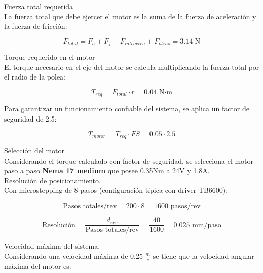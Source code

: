 Fuerza total requerida\\
\noindent
La fuerza total que debe ejercer el motor es la suma de la fuerza de aceleración y la fuerza de fricción:

\begin{equation}
    F_{total} = F_a + F_f + F_{intcorrea} + F_{otras} = 3.14 \text{ N}
\end{equation}

Torque requerido en el motor\\
\noindent
El torque necesario en el eje del motor se calcula multiplicando la fuerza total por el radio de la polea:

\begin{equation}
    T_{req} = F_{total} \cdot r = 0.04\text{ N·m}
\end{equation}

Para garantizar un funcionamiento confiable del sistema, se aplica un factor de seguridad de 2.5:

\begin{equation}
    T_{motor} = T_{req} \cdot FS = 0.05 \cdot 2.5
\end{equation}

Selección del motor\\
\noindent
Considerando el torque calculado con factor de seguridad, se selecciona el motor paso a paso  \textbf{Nema 17 medium} que posee  0.35Nm a 24V y 1.8A. \\

Resolución de posicionamiento.\\
\noindent
Con microstepping de 8 pasos (configuración típica con driver TB6600):

\begin{equation}
    \text{Pasos totales/rev} = 200 \cdot 8 = 1600 \text{ pasos/rev}
\end{equation}

\begin{equation}
    \text{Resolución} = \frac{d_{rev}}{\text{Pasos totales/rev}} = \frac{40}{1600} = 0.025 \text{ mm/paso}
\end{equation}

Velocidad máxima del sistema.\\
\noindent
Considerando una velocidad máxima de 0.25 \(\frac{m}{s}\) se tiene que la velocidad angular máxima del motor es:

